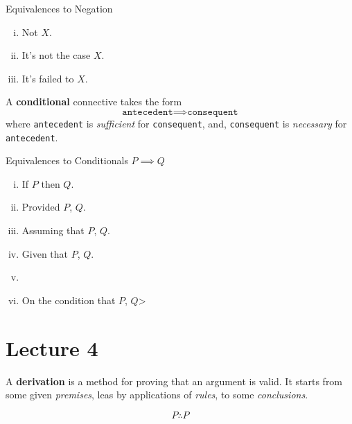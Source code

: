 \documentclass[11pt]{article}
\begin{document}
		\begin{remark}Equivalences to Negation
			\begin{enumerate}[(i)]
				\item Not $X$.
				\item It's not the case $X$.
				\item It's failed to $X$.
			\end{enumerate}
		\end{remark}
		
		\begin{definition}
			A \textbf{conditional} connective takes the form
			\begin{equation}
				\texttt{antecedent} \implies \texttt{consequent}
			\end{equation}
			where \texttt{antecedent} is \emph{sufficient} for \texttt{consequent}, and, \texttt{consequent} is \emph{necessary} for \texttt{antecedent}.
		\end{definition}
		
		\begin{remark} Equivalences to Conditionals $P \implies Q$
			\begin{enumerate}[(i)]
				\item If $P$ then $Q$.
				\item Provided $P$, $Q$.
				\item Assuming that $P$, $Q$.
				\item Given that $P$, $Q$.
				\item {}
				\item On the condition that $P$, $Q$>
			\end{enumerate}
		\end{remark}
		
	\section{Lecture 4}
		\begin{definition}
			A \textbf{derivation} is a method for proving that an argument is valid. It starts from some given \emph{premises}, leas by applications of \emph{rules}, to some \emph{conclusions}.
		\end{definition}
		
		\begin{rules}
			\begin{equation}
				P \therefore P
			\end{equation}
		\end{rules}
		
\end{document}

